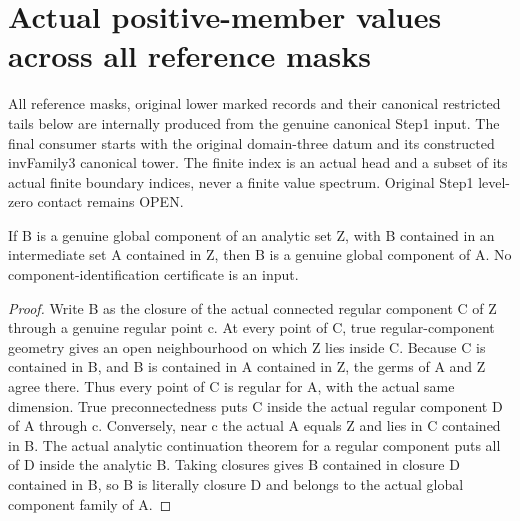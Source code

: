 \section{Actual positive-member values across all reference masks}

All reference masks, original lower marked records and their canonical
restricted tails below are internally produced from the genuine canonical
Step1 input. The final consumer starts with the original domain-three datum
and its constructed invFamily3 canonical tower. The finite index is an actual
head and a subset of its actual finite boundary indices, never a finite value
spectrum. Original Step1 level-zero contact remains OPEN.

\begin{lemma}
\label{hir:member-across-mask-global-component-restriction}
\leanok
{}
If B is a genuine global component of an analytic set Z, with B contained
in an intermediate set A contained in Z, then B is a genuine global component
of A. No component-identification certificate is an input.
\end{lemma}
\begin{proof}
Write B as the closure of the actual connected regular component C of Z
through a genuine regular point c. At every point of C, true regular-component
geometry gives an open neighbourhood on which Z lies inside C. Because C
is contained in B, and B is contained in A contained in Z, the germs of A
and Z agree there. Thus every point of C is regular for A, with the actual
same dimension. True preconnectedness puts C inside the actual regular
component D of A through c. Conversely, near c the actual A equals Z and
lies in C contained in B. The actual analytic continuation theorem for a
regular component puts all of D inside the analytic B. Taking closures gives
B contained in closure D contained in B, so B is literally closure D and
belongs to the actual global component family of A.
\end{proof}

